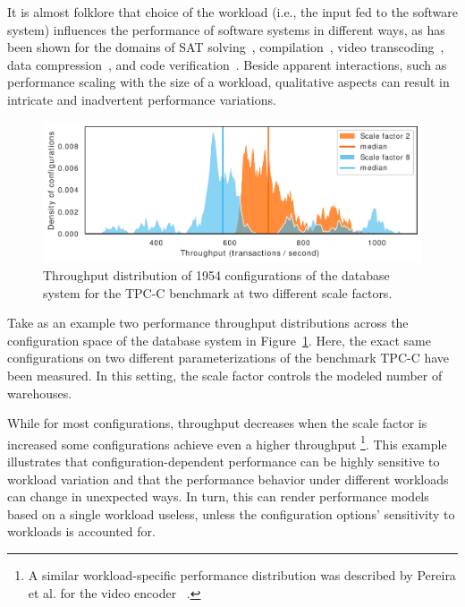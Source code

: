 It is almost folklore that choice of the workload (i.e., the input fed to the software system) influences the performance of software systems in different ways\cite{benchmarking_book}, as has been shown for the domains of SAT solving~\cite{falkner_sat_solvers_2015,satzilla_2008}, compilation~\cite{ding_compilation_2015,plotnikov_compilation_2013}, video transcoding~\cite{maxiaguine_workload_2004,alves_sampling_2020}, data compression~\cite{khavari_compression_2019}, and code verification~\cite{koc_satune_2021}. Beside apparent interactions, such as performance scaling with the size of a workload, qualitative aspects can result in intricate and inadvertent performance variations.

\begin{figure}
	\centering
	\includegraphics[width=\linewidth]{images/h2_intro.pdf}
	\caption{Throughput distribution of 1954 configurations of the database system \htwo for the \textsf{TPC-C} benchmark at two different scale factors.}
	\label{fig:h2_intro}
\end{figure}

Take as an example two performance throughput distributions across the configuration space of the database system \htwo in Figure~\ref{fig:h2_intro}. Here,  the exact same configurations on two different parameterizations of the benchmark \textsf{TPC-C} have been measured. In this setting, the scale factor controls the modeled number of warehouses. 

While for most configurations, throughput decreases when the scale factor is increased some configurations achieve even a higher throughput
\footnote{A similar workload-specific performance distribution was  described by Pereira et al. for the video encoder \xzwo~\cite{alves_sampling_2020}.}. This example illustrates that configuration-dependent performance can be highly sensitive to workload variation and that the performance behavior under different workloads can change in unexpected ways. In turn, this can render performance models based on a single workload useless, unless the configuration options’ sensitivity to workloads is accounted for.

